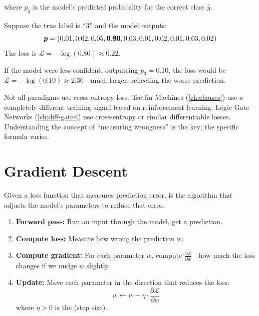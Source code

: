 where $p_{\hat{y}}$ is the model's predicted probability for the
correct class $\hat{y}$.

\begin{example}
Suppose the true label is ``3'' and the model outputs:
\[
  \bm{p} = (0.01, 0.02, 0.05, \mathbf{0.80}, 0.03, 0.01, 0.02, 0.01, 0.03, 0.02)
\]
The loss is $\mathcal{L} = -\log(0.80) \approx 0.22$.

If the model were less confident, outputting $p_3 = 0.10$, the loss
would be $\mathcal{L} = -\log(0.10) \approx 2.30$---much larger,
reflecting the worse prediction.
\end{example}

\begin{engineernote}
Not all paradigms use cross-entropy loss. Tsetlin Machines
(\cref{ch:clauses}) use a completely different training signal based on
reinforcement learning. Logic Gate Networks (\cref{ch:diff-gates}) use
cross-entropy or similar differentiable losses. Understanding the
concept of ``measuring wrongness'' is the key; the specific formula
varies.
\end{engineernote}


\section{Gradient Descent}
\label{sec:gradient-descent}

Given a loss function that measures prediction error,  is the algorithm that adjusts the model's parameters to reduce
that error.

\begin{enumerate}
  \item \textbf{Forward pass:} Run an input through the model, get a
    prediction.
  \item \textbf{Compute loss:} Measure how wrong the prediction is.
  \item \textbf{Compute gradient:} For each parameter $w$, compute
    $\frac{\partial \mathcal{L}}{\partial w}$---how much the loss
    changes if we nudge $w$ slightly.
  \item \textbf{Update:} Move each parameter in the direction that
    reduces the loss:
    \begin{equation}
      w \leftarrow w - \eta \cdot \frac{\partial \mathcal{L}}{\partial w}
      \label{eq:gradient-update}
    \end{equation}
    where $\eta > 0$ is the  (step size).
\end{enumerate}

